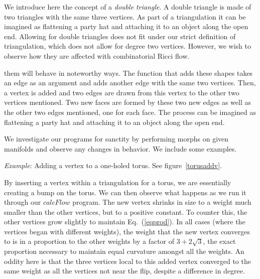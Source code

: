 \documentclass[12pt]{article}
\begin{document}
 We introduce here the concept of a \textit{double triangle}. A double triangle is made of two triangles with the same three vertices. As part of a triangulation it can be imagined as flattening a party hat and attaching it to an object along the open end. Allowing for double triangles does not fit under our strict definition of triangulation, which does not allow for degree two vertices. However, we wish to observe how they are affected with combinatorial Ricci flow.

  them will behave in noteworthy ways. The function that adds these shapes takes an edge as an argument and adds another edge with the same two vertices. Then, a vertex is added and two edges are drawn from this vertex to the other two vertices mentioned. Two new faces are formed by these two new edges as well as the other two edges mentioned, one for each face. The process can be imagined as flattening a party hat and attaching it to an object along the open end.

 We investigate our programs for sanctity by performing morphs on given manifolds and observe any changes in behavior. We include some examples. 

 \textit{Example}: Adding a vertex to a one-holed torus. See figure~\ref{torusaddv}. 

 By inserting a vertex within a triangulation for a torus, we are essentially creating a bump on the torus. We can then observe what happens as we run it through our $calcFlow$ program. The new vertex shrinks in size to a weight much smaller than the other vertices, but to a positive constant. To counter this, the other vertices grow slightly to maintain Eq.~(\ref{eqprod}). In all cases (where the vertices began with different weights), the weight that the new vertex converges to is in a proportion to the other weights by a factor of $3+2\sqrt{3}$, the exact proportion necessary to maintain equal curvature amongst all the weights. An oddity here is that the three vertices local to this added vertex converged to the same weight as all the vertices not near the flip, despite a difference in degree.
\end{document}
